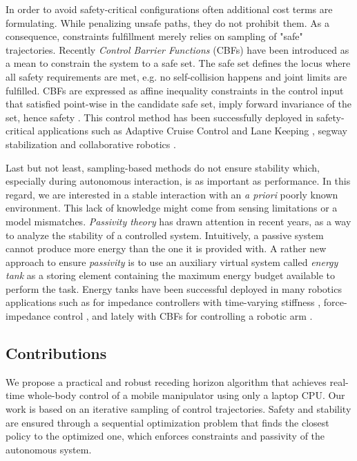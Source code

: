 In order to avoid safety-critical configurations often additional cost terms are formulating. While penalizing unsafe paths, they do not prohibit them. As a consequence, constraints fulfillment merely relies on sampling of "safe" trajectories. 
Recently \emph{Control Barrier Functions} (CBFs) have been introduced as a mean to constrain the system to a safe set. The safe set defines the locus where all safety requirements are met, e.g. no self-collision happens and joint limits are fulfilled. CBFs are expressed as affine inequality constraints in the control input that satisfied point-wise in the candidate safe set, imply forward invariance of the set, hence safety \cite{ames2016control}.  This control method has been successfully deployed in safety-critical applications such as Adaptive Cruise Control and Lane Keeping \cite{vahidi2003research}, segway stabilization \cite{gurriet2018towards} and collaborative robotics \cite{benzi2021optimization}.

Last but not least, sampling-based methods do not ensure stability which, especially during autonomous interaction, is as important as performance. In this regard, we are interested in a stable interaction with an \emph{a priori} poorly known environment. This lack of knowledge might come from sensing limitations or a model mismatches. \emph{Passivity theory} has drawn attention in recent years, as a way to analyze the stability of a controlled system. Intuitively, a passive system cannot produce more energy than the one it is provided with. A rather new approach to ensure \emph{passivity} is to use an auxiliary virtual system called \emph{energy tank} as a storing element containing the maximum energy budget available to perform the task. Energy tanks have been successful deployed in many robotics applications such as for impedance controllers with time-varying stiffness \cite{schindlbeck2015unified}, force-impedance control \cite{shahriari2018valve}, and lately with CBFs for controlling a robotic arm \cite{benzi2021optimization}.

\subsection{Contributions}

We propose a practical and robust receding horizon algorithm that achieves real-time whole-body control of a mobile manipulator using only a laptop CPU. Our work is based on an iterative sampling of control trajectories. Safety and stability are ensured through a sequential optimization problem that finds the closest policy to the optimized one, which enforces constraints and passivity of the autonomous system.

